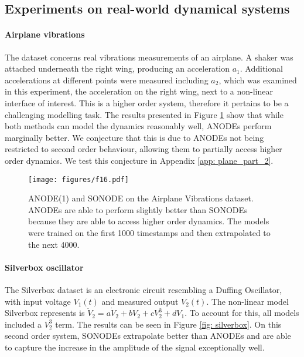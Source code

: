 \documentclass{article}
\theoremstyle{remark}
\theoremstyle{definition}
\begin{document}
\subsection{Experiments on real-world dynamical systems}
\label{sec: planes}

\paragraph{Airplane vibrations} The dataset \cite{noel2017f} concerns real vibrations measurements of an airplane. A shaker was attached underneath the right wing, producing an acceleration $a_{1}$. Additional accelerations at different points were measured including $a_{2}$, which was examined in this experiment, the acceleration on the right wing, next to a non-linear interface of interest. This is a higher order system, therefore it pertains to be a challenging modelling task. The results presented in Figure \ref{fig: f16} show that while both methods can model the dynamics reasonably well, ANODEs perform marginally better. We conjecture that this is due to ANODEs not being restricted to second order behaviour, allowing them to partially access higher order dynamics. We test this conjecture in Appendix \ref{app: plane_part_2}. 


\begin{figure}[h]
\centering
    \texttt{[image: figures/f16.pdf]}
    \vspace{-10pt}
    \caption{ANODE(1) and SONODE on the Airplane Vibrations dataset. ANODEs are able to perform slightly better than SONODEs because they are able to access higher order dynamics. The models were trained on the first 1000 timestamps and then extrapolated to the next 4000.}
\label{fig: f16}
\end{figure}



\paragraph{Silverbox oscillator} The Silverbox dataset \cite{6669201} is an electronic circuit resembling a Duffing Oscillator, with input voltage $V_{1}(t)$ and measured output $V_{2}(t)$. The non-linear model Silverbox represents is $\ddot{V}_{2} = a\dot{V}_{2} + bV_{2} + cV_{2}^{3} + dV_{1}$. To account for this, all models included a $V_{2}^{3}$ term. 
The results can be seen in Figure \ref{fig: silverbox}. On this second order system, SONODEs extrapolate better than ANODEs and are able to capture the increase in the amplitude of the signal exceptionally well. 
\end{document}
